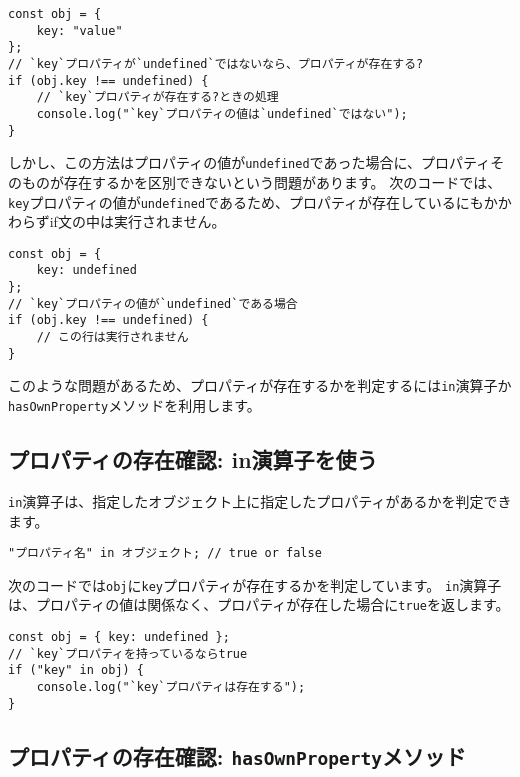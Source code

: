 \begin{lstlisting}
const obj = {
    key: "value"
};
// `key`プロパティが`undefined`ではないなら、プロパティが存在する?
if (obj.key !== undefined) {
    // `key`プロパティが存在する?ときの処理
    console.log("`key`プロパティの値は`undefined`ではない");
}
\end{lstlisting}

しかし、この方法はプロパティの値が\texttt{undefined}であった場合に、プロパティそのものが存在するかを区別できないという問題があります。
次のコードでは、\texttt{key}プロパティの値が\texttt{undefined}であるため、プロパティが存在しているにもかかわらずif文の中は実行されません。

\begin{lstlisting}
const obj = {
    key: undefined
};
// `key`プロパティの値が`undefined`である場合
if (obj.key !== undefined) {
    // この行は実行されません
}
\end{lstlisting}

このような問題があるため、プロパティが存在するかを判定するには\texttt{in}演算子か\texttt{hasOwnProperty}メソッドを利用します。

\hypertarget{in-operator}{%
\subsection{プロパティの存在確認: in演算子を使う}\label{in-operator}}

\texttt{in}演算子は、指定したオブジェクト上に指定したプロパティがあるかを判定できます。

\begin{lstlisting}
"プロパティ名" in オブジェクト; // true or false
\end{lstlisting}

次のコードでは\texttt{obj}に\texttt{key}プロパティが存在するかを判定しています。
\texttt{in}演算子は、プロパティの値は関係なく、プロパティが存在した場合に\texttt{true}を返します。

\begin{lstlisting}
const obj = { key: undefined };
// `key`プロパティを持っているならtrue
if ("key" in obj) {
    console.log("`key`プロパティは存在する");
}
\end{lstlisting}

\hypertarget{hasOwnProperty-method}{%
\subsection{\texorpdfstring{プロパティの存在確認:
\texttt{hasOwnProperty}メソッド}{プロパティの存在確認: hasOwnPropertyメソッド}}\label{hasOwnProperty-method}}


